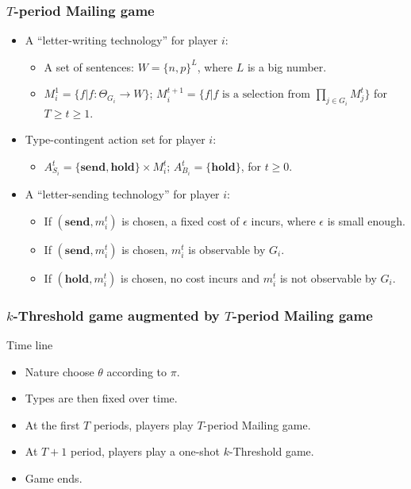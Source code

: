 \documentclass[9pt]{beamer}
\begin{document}
\begin{frame}
  \frametitle{$T$-period Mailing game}

\begin{itemize}

\item A ``letter-writing technology'' for player $i$:
\begin{itemize}
\item A set of sentences: $W=\{n,p\}^L$, where $L$ is a big number.
\item $M^1_i=\{f|f:\Theta_{G_i}\rightarrow W\}$; $M^{t+1}_i=\{f|f\text{ is a selection from }\prod_{j\in G_i}M^{t}_j\}$ for $T\geq t\geq 1$.
\end{itemize}

\item Type-contingent action set for player $i$:
\begin{itemize}
\item $A^t_{S_i}=\{\textbf{send},\textbf{hold}\}\times M^t_i$; $A^t_{B_i}=\{\textbf{hold}\}$, for $t\geq 0$.
\end{itemize}

\item A ``letter-sending technology'' for player $i$:
\begin{itemize}
\item If $(\textbf{send},m^t_i)$ is chosen, a fixed cost of $\epsilon$ incurs, where $\epsilon$ is small enough.
\item If $(\textbf{send},m^t_i)$ is chosen, $m^t_i$ is observable by $G_i$.
\item If $(\textbf{hold},m^t_i)$ is chosen, no cost incurs and $m^t_i$ is not observable by $G_i$.
\end{itemize}
\end{itemize}

\end{frame}


\begin{frame}
  \frametitle{$k$-Threshold game augmented by $T$-period Mailing game}

Time line
\begin{itemize}

\item Nature choose $\theta$ according to $\pi$.
\item Types are then fixed over time.
\item At the first $T$ periods, players play $T$-period Mailing game.
\item At $T+1$ period, players play a one-shot $k$-Threshold game.
\item Game ends.
\end{itemize}

\end{frame}
\end{document}
